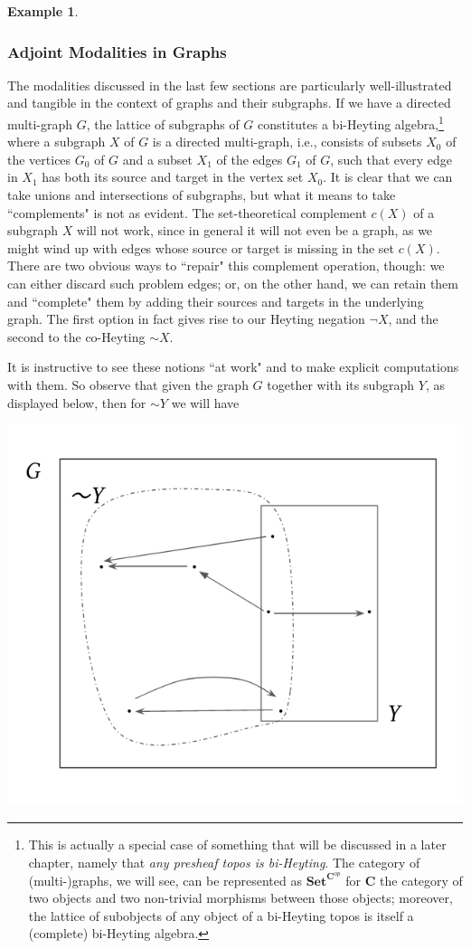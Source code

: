 \documentclass[a4paper]{book}
\theoremstyle{definition}
\newtheorem{example}{Example}[section]
\theoremstyle{definition}
\theoremstyle{definition}
\theoremstyle{theorem}
\theoremstyle{definition}
\begin{document}
\begin{example}
\subsubsection{Adjoint Modalities in Graphs}
	The modalities discussed in the last few sections are particularly well-illustrated and tangible in the context of graphs and their subgraphs. If we have a directed multi-graph $G$, the lattice of subgraphs of $G$ constitutes a bi-Heyting algebra,\footnote{This is actually a special case of something that will be discussed in a later chapter, namely that \textit{any presheaf topos is bi-Heyting}. The category of (multi-)graphs, we will see, can be represented as $\textbf{Set}^{\textbf{C}^{op}}$ for $\textbf{C}$ the category of two objects and two non-trivial morphisms between those objects; moreover, the lattice of subobjects of any object of a bi-Heyting topos is itself a (complete) bi-Heyting algebra.} where a subgraph $X$ of $G$ is a directed multi-graph, i.e., consists of subsets $X_0$ of the vertices $G_0$ of $G$ and a subset $X_1$ of the edges $G_1$ of $G$, such that every edge in $X_1$ has both its source and target in the vertex set $X_0$. It is clear that we can take unions and intersections of subgraphs, but what it means to take ``complements" is not as evident. The set-theoretical complement $c(X)$ of a subgraph $X$ will not work, since in general it will not even be a graph, as we might wind up with edges whose source or target is missing in the set $c(X)$. There are two obvious ways to ``repair" this complement operation, though: we can either discard such problem edges; or, on the other hand, we can retain them and ``complete" them by adding their sources and targets in the underlying graph. The first option in fact gives rise to our Heyting negation $\neg X$, and the second to the co-Heyting $\sim X$. \par 
	It is instructive to see these notions ``at work" and to make explicit computations with them. So observe that given the graph $G$ together with its subgraph $Y$, as displayed below, then for $\sim Y$ we will have 
	\begin{center}
		\includegraphics*[scale=0.3]{GraphNegationAlone2.png}

\end{center}
\end{example}
\end{document}
